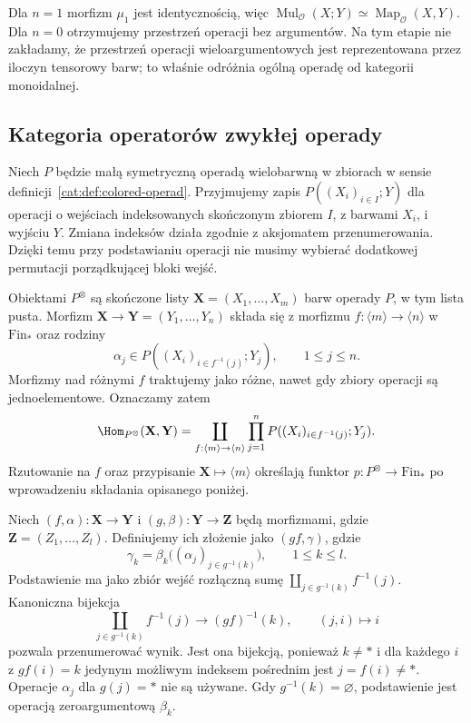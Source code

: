 Dla $n=1$ morfizm $\mu_1$ jest identycznością, więc $\operatorname{Mul}_{\mathcal O}(X;Y)\simeq\operatorname{Map}_{\mathcal O}(X,Y)$. Dla $n=0$ otrzymujemy przestrzeń operacji bez argumentów. Na tym etapie nie zakładamy, że przestrzeń operacji wieloargumentowych jest reprezentowana przez iloczyn tensorowy barw; to właśnie odróżnia ogólną operadę od kategorii monoidalnej.

\subsection{Kategoria operatorów zwykłej operady}

Niech $P$ będzie małą symetryczną operadą wielobarwną w zbiorach w sensie definicji~\ref{cat:def:colored-operad}. Przyjmujemy zapis $P((X_i)_{i\in I};Y)$ dla operacji o wejściach indeksowanych skończonym zbiorem $I$, z barwami $X_i$, i wyjściu $Y$. Zmiana indeksów działa zgodnie z aksjomatem przenumerowania. Dzięki temu przy podstawianiu operacji nie musimy wybierać dodatkowej permutacji porządkującej bloki wejść.

\begin{definicja}\label{cat:def:infty-operad-operator-category}
Obiektami $P^\otimes$ są skończone listy $\mathbf X=(X_1,\ldots,X_m)$ barw operady $P$, w tym lista pusta. Morfizm $\mathbf X\to\mathbf Y=(Y_1,\ldots,Y_n)$ składa się z morfizmu $f:\langle m\rangle\to\langle n\rangle$ w $\mathrm{Fin}_*$ oraz rodziny
\[
 \alpha_j\in P((X_i)_{i\in f^{-1}(j)};Y_j),
 \qquad 1\leq j\leq n.
\]
Morfizmy nad różnymi $f$ traktujemy jako różne, nawet gdy zbiory operacji są jednoelementowe. Oznaczamy zatem
\begin{equation}\label{cat:eq:infty-operator-hom}
 \Hom_{P^\otimes}(\mathbf X,\mathbf Y)=
 \coprod_{f:\langle m\rangle\to\langle n\rangle}
 \prod_{j=1}^n P((X_i)_{i\in f^{-1}(j)};Y_j).
\end{equation}
Rzutowanie na $f$ oraz przypisanie $\mathbf X\mapsto\langle m\rangle$ określają funktor $p:P^\otimes\to\mathrm{Fin}_*$ po wprowadzeniu składania opisanego poniżej.
\end{definicja}

Niech $(f,\alpha):\mathbf X\to\mathbf Y$ i $(g,\beta):\mathbf Y\to\mathbf Z$ będą morfizmami, gdzie $\mathbf Z=(Z_1,\ldots,Z_l)$. Definiujemy ich złożenie jako $(gf,\gamma)$, gdzie
\begin{equation}\label{cat:eq:infty-operator-composition}
 \gamma_k=\beta_k\bigl((\alpha_j)_{j\in g^{-1}(k)}\bigr),
 \qquad 1\leq k\leq l.
\end{equation}
Podstawienie ma jako zbiór wejść rozłączną sumę $\coprod_{j\in g^{-1}(k)} f^{-1}(j)$. Kanoniczna bijekcja
\[
 \coprod_{j\in g^{-1}(k)} f^{-1}(j)
 \longrightarrow (gf)^{-1}(k),\qquad (j,i)\longmapsto i
\]
pozwala przenumerować wynik. Jest ona bijekcją, ponieważ $k\neq *$ i dla każdego $i$ z $gf(i)=k$ jedynym możliwym indeksem pośrednim jest $j=f(i)\neq *$. Operacje $\alpha_j$ dla $g(j)=*$ nie są używane. Gdy $g^{-1}(k)=\varnothing$, podstawienie jest operacją zeroargumentową $\beta_k$.

